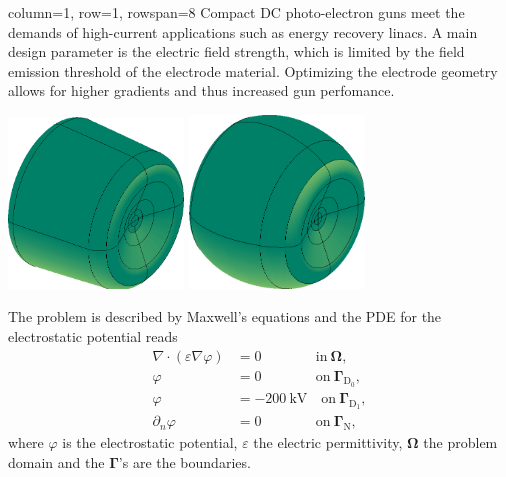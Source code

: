 \documentclass[
   accentcolor=9b,
   boxstyle=boxed
   ]{tudasciposter}
\begin{document}
\begin{tcbposter}[poster={columns=2, rows=20, spacing=1cm}]

\begin{posterboxenv}[title=Motivation]{column=1, row=1, rowspan=8}
   Compact DC photo-electron guns meet the demands of high-current applications such as energy recovery linacs. A main design parameter is the electric field strength, which is limited by the field emission threshold of the electrode material. Optimizing the electrode geometry allows for higher gradients and thus increased gun perfomance.
   \begin{center}
      \includegraphics[width=0.35\textwidth]{fig/electrode_init.png}
      \qquad \qquad \qquad
      \includegraphics[width=0.35\textwidth]{fig/electrode_opt.png}
   \end{center}
   The problem is described by Maxwell's equations and the PDE for the electrostatic potential reads
   \begin{align*}
      \nabla \cdot (\varepsilon \nabla \varphi) &= 0 \phantom{-00 kV} \quad \mathrm{in}\ \boldsymbol{\Omega},\\
      \varphi &= 0 \phantom{-00 kV} \quad \mathrm{on}\ \boldsymbol{\Gamma}_\mathrm{D_0},\\
      \varphi &= -200\ \mathrm{kV} \quad \mathrm{on}\ \boldsymbol{\Gamma}_\mathrm{D_1},\\
      \partial_n \varphi &= 0 \phantom{-00 kV} \quad \mathrm{on}\ \boldsymbol{\Gamma}_\mathrm{N},
      \end{align*}
   where $\varphi$ is the electrostatic potential, $\varepsilon$ the electric permittivity, $\boldsymbol{\Omega}$ the problem domain and the $\boldsymbol{\Gamma}$'s are the boundaries.
\end{posterboxenv}


\end{tcbposter}
\end{document}
